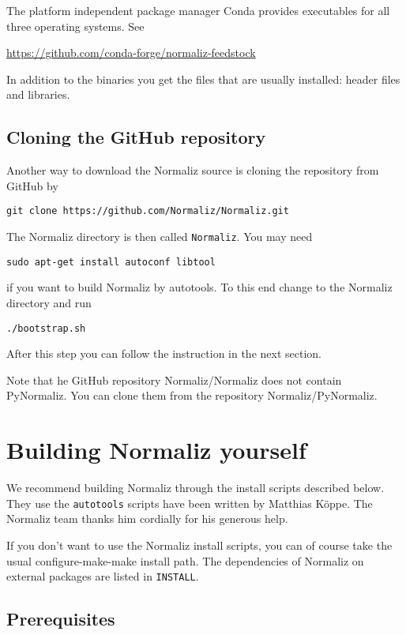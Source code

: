 \documentclass[12pt,a4paper]{scrartcl}
\theoremstyle{definition}
\begin{document}
The platform independent package manager Conda provides executables for all three operating systems. See
\begin{center}
	\url{https://github.com/conda-forge/normaliz-feedstock}
\end{center}
In addition to the binaries you get the files that are usually installed: header files and libraries.

\subsection{Cloning the GitHub repository}

Another way to download the Normaliz source is cloning the repository from GitHub by
\begin{Verbatim}
git clone https://github.com/Normaliz/Normaliz.git
\end{Verbatim}
The Normaliz directory is then called \verb|Normaliz|. You may need
\begin{Verbatim}
sudo apt-get install autoconf libtool
\end{Verbatim}
if you want to build Normaliz by autotools. To this end change to the Normaliz directory and run
\begin{Verbatim}
./bootstrap.sh
\end{Verbatim}
After this step you can follow the instruction in the next section.

Note that he GitHub repository Normaliz/Normaliz does not contain PyNormaliz. You can clone them from the repository Normaliz/PyNormaliz.

\section{Building Normaliz yourself}\label{Compile}

We recommend building Normaliz through the install scripts described below. They use the \verb|autotools| scripts have been written by Matthias K\"oppe. The Normaliz team thanks him cordially for his generous help.

If you don't want to use the Normaliz install scripts, you can of course take the usual configure-make-make install path. The dependencies of Normaliz on external packages are listed in \verb|INSTALL|.

\subsection{Prerequisites}
\end{document}
